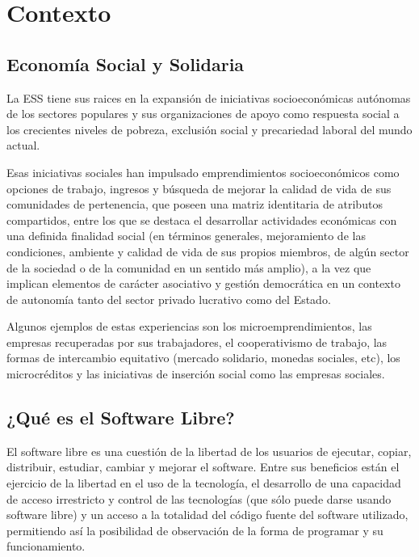 \chapter{Contexto}

\section{Economía Social y Solidaria}
La ESS tiene sus raices en la expansión de iniciativas socioeconómicas autónomas de los sectores populares y sus organizaciones de apoyo como respuesta social a los crecientes niveles de pobreza, exclusión social y precariedad laboral del mundo actual. 

Esas iniciativas sociales han impulsado emprendimientos socioeconómicos como opciones de trabajo, ingresos y búsqueda de mejorar la calidad de vida de sus comunidades de pertenencia, que poseen una matriz identitaria de atributos compartidos, entre los que se destaca el desarrollar actividades económicas con una definida finalidad social (en términos  generales, mejoramiento de las condiciones, ambiente y calidad de vida de sus propios miembros, de algún sector de la sociedad o de la comunidad en un sentido más amplio), a la vez que implican elementos de carácter asociativo y gestión democrática en un contexto de autonomía tanto del sector privado lucrativo como del Estado. 

Algunos ejemplos de estas experiencias son los microemprendimientos, las empresas recuperadas por  sus trabajadores, el cooperativismo de trabajo, las formas de intercambio equitativo (mercado solidario, monedas sociales, etc), los microcréditos y las iniciativas de inserción social como las empresas sociales.






\section{¿Qué es el Software Libre?}

El software libre es una cuestión de la libertad  de los  usuarios  de  ejecutar, copiar, distribuir, estudiar, cambiar y mejorar el software. Entre sus beneficios están el ejercicio de la libertad en el uso de la tecnología, el desarrollo de una capacidad de acceso irrestricto y control de las tecnologías (que sólo puede darse usando software libre) y un acceso a la totalidad del código fuente del software utilizado, permitiendo así la posibilidad de observación de la forma de  programar y su funcionamiento.\\

